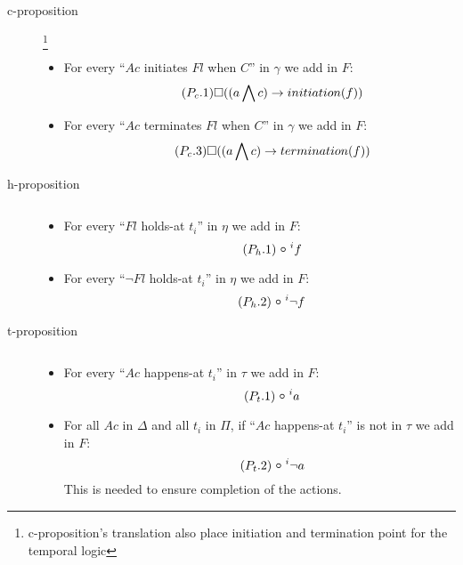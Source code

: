 \begin{description}
  \item[c-proposition]\footnote{c-proposition's translation also place initiation and termination point for the temporal logic}
  \begin{itemize}
    \item For every “$Ac$ initiates $Fl$ when $C$” in $\gamma$ we add in $F$:
    \begin{equation}\tag{$P_c.1$}
      \square((a\bigwedge c)\rightarrow initiation(f))
    \end{equation}
    \item For every “$Ac$ terminates $Fl$ when $C$” in $\gamma$ we add in $F$:
    \begin{equation}\tag{$P_c.3$}
      \square((a\bigwedge c)\rightarrow termination(f))
    \end{equation}
  \end{itemize}
  \item[h-proposition] $ $
  \begin{itemize}
    \item For every “$Fl$ holds-at $t_i$” in $\eta$ we add in $F$:
    \begin{equation}\tag{$P_h.1$}
      \next^{i}f
    \end{equation}
    \item For every “$\neg Fl$ holds-at $t_i$” in $\eta$ we add in $F$:
    \begin{equation}\tag{$P_h.2$}
      \next^{i} \neg f
    \end{equation}
  \end{itemize}
  \item[t-proposition] $ $
  \begin{itemize}
    \item For every “$Ac$ happens-at $t_i$” in $\tau$ we add in $F$:
    \begin{equation}\tag{$P_t.1$}
      \next^{i}a
    \end{equation}
    \item For all $Ac$ in $\Delta$ and all $t_i$ in $\Pi$, if “$Ac$ happens-at $t_i$” is not in $\tau$ we add in $F$:
    \begin{equation}\tag{$P_t.2$}
      \next^{i}\neg a
    \end{equation}
      This is needed to ensure completion of the actions.
  \end{itemize}
\end{description}

